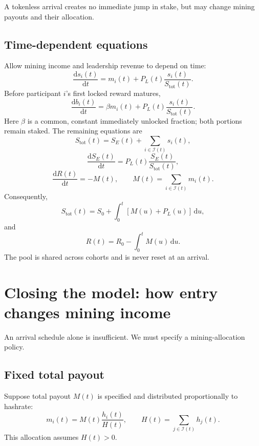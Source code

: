 \documentclass[11pt,a4paper]{article}
\newcommand{\rmd}{\mathrm{d}}
\begin{document}
A tokenless arrival creates no immediate jump in stake, but may change mining payouts and their allocation.

\subsection*{Time-dependent equations}
Allow mining income and leadership revenue to depend on time:
\begin{equation}
\boxed{\frac{\rmd s_i(t)}{\rmd t}=m_i(t)+P_L(t)\frac{s_i(t)}{S_{\mathrm{tot}}(t)}.}
\end{equation}
Before participant $i$'s first locked reward matures,
\begin{equation}
\boxed{\frac{\rmd b_i(t)}{\rmd t}=\beta m_i(t)+P_L(t)\frac{s_i(t)}{S_{\mathrm{tot}}(t)}.}
\end{equation}
Here $\beta$ is a common, constant immediately unlocked fraction; both portions remain staked. The remaining equations are
\begin{equation}
S_{\mathrm{tot}}(t)=S_E(t)+\sum_{i\in\mathcal I(t)}s_i(t),
\end{equation}
\begin{equation}
\frac{\rmd S_E(t)}{\rmd t}=P_L(t)\frac{S_E(t)}{S_{\mathrm{tot}}(t)},
\end{equation}
\begin{equation}
\frac{\rmd R(t)}{\rmd t}=-M(t),\qquad M(t)=\sum_{i\in\mathcal I(t)}m_i(t).
\end{equation}
Consequently,
\begin{equation}
\boxed{S_{\mathrm{tot}}(t)=S_0+\int_0^t[M(u)+P_L(u)]\,\rmd u,}
\end{equation}
and
\begin{equation}
\boxed{R(t)=R_0-\int_0^tM(u)\,\rmd u.}
\end{equation}
The pool is shared across cohorts and is never reset at an arrival.

\section{Closing the model: how entry changes mining income}
An arrival schedule alone is insufficient. We must specify a mining-allocation policy.

\subsection{Fixed total payout}
Suppose total payout $M(t)$ is specified and distributed proportionally to hashrate:
\begin{equation}
m_i(t)=M(t)\frac{h_i(t)}{H(t)},\qquad H(t)=\sum_{j\in\mathcal I(t)}h_j(t).
\end{equation}
This allocation assumes $H(t)>0$.
\end{document}
